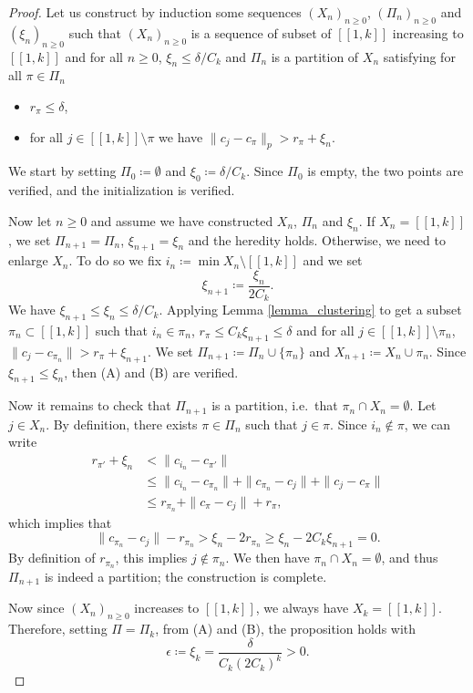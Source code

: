 \documentclass[a4paper, 11pt]{article}
\theoremstyle{plain}
\theoremstyle{definition}
\newcommand{\range}[2]{[\![#1,#2]\!]}
\numberwithin{equation}{section}
\begin{document}
\begin{proof}
    Let us construct by induction some sequences $(X_n)_{n\geq 0}$, $(\Pi_n)_{n\geq 0}$ and $(\xi_n)_{n\geq 0}$ such that $(X_n)_{n\geq 0}$ is a sequence of subset of $\range{1}{k}$ increasing to $\range{1}{k}$ and for all $n\geq0$, $\xi_n\leq\delta/C_k$ and $\Pi_n$ is a partition of $X_n$ satisfying for all $\pi\in\Pi_n$
        \begin{itemize}
            \item[(A)] $r_\pi\leq\delta$,
            \item[(B)] for all $j\in\range{1}{k}\setminus\pi$ we have $\|c_j-c_\pi\|_p>r_\pi+\xi_n$.
        \end{itemize}
    We start by setting $\Pi_0\coloneqq\emptyset$ and $\xi_0\coloneqq\delta/C_k$. Since $\Pi_0$ is empty, the two points are verified, and the initialization is verified. 
    
    Now let $n\geq0$ and assume we have constructed $X_n$, $\Pi_n$ and $\xi_n$. If $X_n=\range{1}{k}$, we set $\Pi_{n+1}=\Pi_n$, $\xi_{n+1}=\xi_n$ and the heredity holds. Otherwise, we need to enlarge $X_n$. To do so we fix $i_n\coloneqq\min X_n\setminus\range{1}{k}$ and we set
        \[\xi_{n+1}\coloneqq\frac{\xi_n}{2C_k}.\]
    We have $\xi_{n+1}\leq\xi_n\leq\delta/C_k$. Applying Lemma \ref{lemma_clustering} to get a subset $\pi_n\subset\range{1}{k}$ such that $i_n\in\pi_n$, $r_\pi\leq C_k\xi_{n+1}\leq\delta$ and for all $j\in\range{1}{k}\setminus\pi_n$, $\|c_j-c_{\pi_n}\|>r_\pi+\xi_{n+1}$. We set $\Pi_{n+1}\coloneqq\Pi_n\cup\{\pi_n\}$ and $X_{n+1}\coloneqq X_n\cup\pi_n$. Since $\xi_{n+1}\leq\xi_n$, then (A) and (B) are verified. 
    
    Now it remains to check that $\Pi_{n+1}$ is a partition, i.e.\ that $\pi_n\cap X_n=\emptyset$. Let $j\in X_n$. By definition, there exists $\pi\in\Pi_n$ such that $j\in\pi$. Since $i_n\notin\pi$, we can write
        \begin{equation*}
            \begin{split}
                r_{\pi'}+\xi_n&<\|c_{i_n}-c_{\pi'}\|\\
                &\leq\|c_{i_n}-c_{\pi_n}\|+\|c_{\pi_n}-c_j\|+\|c_j-c_{\pi}\|\\
                &\leq r_{\pi_n}+\|c_\pi-c_{j}\|+r_\pi,
            \end{split}
        \end{equation*}
    which implies that
        \begin{equation*}
                \|c_{\pi_n}-c_j\|-r_{\pi_n}>\xi_n-2r_{\pi_n}\geq\xi_n-2C_k\xi_{n+1}=0.
        \end{equation*}
    By definition of $r_{\pi_n}$, this implies $j\notin\pi_n$. We then have $\pi_n\cap X_n=\emptyset$, and thus $\Pi_{n+1}$ is indeed a partition; the construction is complete.

    Now since $(X_n)_{n\geq0}$ increases to $\range{1}{k}$, we always have $X_k=\range{1}{k}$. Therefore, setting $\Pi=\Pi_k$, from (A) and (B), the proposition holds with 
        \[\epsilon\coloneqq\xi_k=\frac{\delta}{C_k(2C_k)^k}>0.\]
\end{proof}
\end{document}
